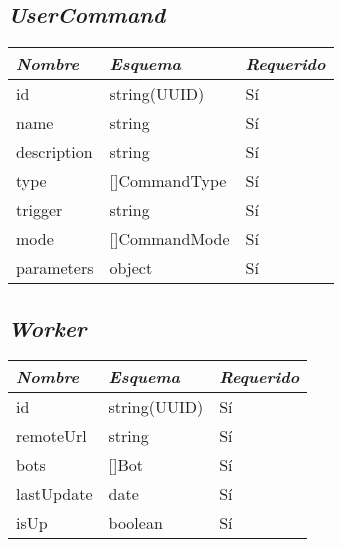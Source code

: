 \subsection{\textit{UserCommand}}
\begin{table}[H]
    \centering
    \def\arraystretch{1.25}
    \begin{adjustbox}{max width=\textwidth}
    \begin{tabularx}{\textwidth}{|L|l|l|}
    \hline
        \textbf{\textit{Nombre}} & \textbf{\textit{Esquema}} & \textbf{\textit{Requerido}} \\ \hline
    \hline
        id & string(UUID) & Sí \\ \hline
        name & string & Sí \\ \hline
        description & string & Sí \\ \hline
        type & []CommandType & Sí \\ \hline
        trigger & string & Sí \\ \hline
        mode & []CommandMode & Sí \\ \hline
        parameters & object & Sí \\ \hline
    \end{tabularx}
    \end{adjustbox}
\end{table}

\subsection{\textit{Worker}}
\begin{table}[H]
    \centering
    \def\arraystretch{1.25}
    \begin{adjustbox}{max width=\textwidth}
    \begin{tabularx}{\textwidth}{|L|l|l|}
    \hline
        \textbf{\textit{Nombre}} & \textbf{\textit{Esquema}} & \textbf{\textit{Requerido}} \\ \hline
    \hline
        id & string(UUID) & Sí \\ \hline
        remoteUrl & string & Sí \\ \hline
        bots & []Bot & Sí \\ \hline
        lastUpdate & date & Sí \\ \hline
        isUp & boolean & Sí \\ \hline
    \end{tabularx}
    \end{adjustbox}
\end{table}








